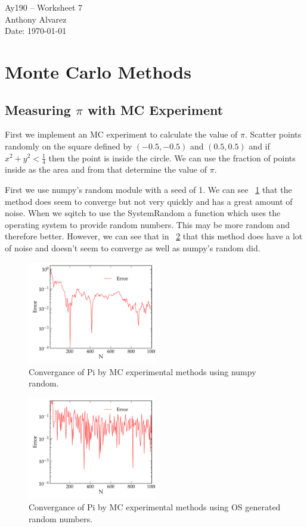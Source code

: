 \documentclass[11pt,letterpaper]{article}
\begin{document}
\begin{center}
\Large
Ay190 -- Worksheet 7\\
Anthony Alvarez\\
Date: \today
\end{center}

\section{Monte Carlo Methods}
\subsection{Measuring $\pi$ with MC Experiment}

First we implement an MC experiment to calculate the value of $\pi$. Scatter 
points randomly on the square defined by $(-0.5,-0.5)$ and $(0.5,0.5)$ and if 
$x^2 + y^2 < \frac{1}{4}$ then the point is inside the circle. We can use the 
fraction of points inside as the area and from that determine the value of 
$\pi$. 

First we use numpy's random module with a seed of 1. We can see 
~\ref{fig:nprand} that the method does seem to converge but not very quickly 
and has a great amount of noise. When we sqitch to use the SystemRandom
a function which uses the operating system to provide random numbers. This may
be more random and therefore better. However, we can see that in ~\ref{fig:sys}
that this method does have a lot of noise and doesn't seem to converge as well
as numpy's random did. 

\begin{figure}[bth]
\centering
\includegraphics[width=0.5\textwidth]{1a.pdf}
\caption{Convergance of Pi by MC experimental methods using numpy random.}
\label{fig:nprand}
\end{figure}

\begin{figure}[bth]
\centering
\includegraphics[width=0.5\textwidth]{1b.pdf}
\caption{Convergance of Pi by MC experimental methods using OS 
generated random numbers.}
\label{fig:sys}
\end{figure}
\end{document}
